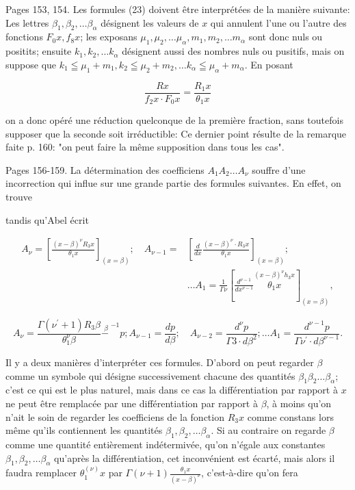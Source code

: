 \documentclass{article}
\begin{document}
Pages 153, 154. Les formules (23) doivent être interprétées de la manière suivante: Les lettres \(\beta_{1}, \beta_{2}, \ldots \beta_{\alpha}\) désignent les valeurs de \(x\) qui annulent l'une ou l'autre des fonctions \(F_{0} x, f_{8} x\); les exposans \(\mu_{1}, \mu_{2}, \ldots \mu_{\alpha}, m_{1}, m_{2}, \ldots m_{\alpha}\) sont donc nuls ou positits; ensuite \(k_{1}, k_{2}, \ldots k_{\alpha}\) désignent aussi des nombres nuls ou pusitifs, mais on suppose que \(k_{1} \leqq \mu_{1}+m_{1}, k_{2} \leqq \mu_{2}+m_{2}, \ldots k_{\alpha} \leqq \mu_{\alpha}+m_{\alpha}\). En posant

\[
\frac{R x}{f_{2} x \cdot F_{0} x}=\frac{R_{1} x}{\theta_{1} x}
\]

on a donc opéré une réduction quelconque de la première fraction, sans toutefois supposer que la seconde soit irréductible: Ce dernier point résulte de la remarque faite p. 160: "on peut faire la même supposition dans tous les cas".

Pages 156-159. La détermination des coefficiens \(A_{1} A_{2} \ldots A_{\nu}\) souffre d'une incorrection qui influe sur une grande partie des formules suivantes. En effet, on trouve

tandis qu'Abel écrit

\[
\begin{aligned}
A_{\nu}=\left[\frac{(x-\beta)^{\nu} R_{3} x}{\theta_{1} x}\right]_{(x=\beta)} ; \quad A_{\nu-1}= & {\left[\frac{d}{d x} \frac{(x-\beta)^{\nu} \cdot R_{3} x}{\theta_{1} x}\right]_{(x=\beta)} ; } \\
& \ldots A_{1}=\frac{1}{\Gamma \nu}\left[\frac{d^{\nu-1}}{d x^{\nu-1}} \stackrel{(x-\beta)^{\nu} h_{3} x}{\theta_{1} x}\right]_{(x=\beta)},
\end{aligned}
\]

\[
A_{\nu}=\frac{\Gamma\left(\nu^{\prime}+1\right) R_{3} \beta}{\theta_{1}^{\nu} \beta} \stackrel{\beta}{-~}^{-1} p ; A_{\nu-1}=\frac{d p}{d \beta} ; \quad A_{\nu-2}=\frac{d^{\nu} p}{\Gamma 3 \cdot d \beta^{2}} ; \ldots A_{1}=\frac{d^{\nu-1} p}{\Gamma \nu^{\prime} \cdot d \beta^{\nu-1}} .
\]

Il y a deux manières d'interpréter ces formules. D'abord on peut regarder \(\beta\) comme un symbole qui désigne successivement chacune des quantités \(\beta_{1} \beta_{2} \ldots \beta_{\alpha}\); c'est ce qui est le plus naturel, mais dans ce cas la différentiation par rapport à \(x\) ne peut être remplacée par une différentiation par rapport à \(\beta\), à moins qu'on n'ait le soin de regarder les coefficiens de la fonction \(R_{3} x\) comme constans lors même qu'ils contiennent les quantités \(\beta_{1}, \beta_{2}, \ldots \beta_{\alpha}\). Si au contraire on regarde \(\beta\) comme une quantité entièrement indétermivée, qu'on n'égale aux constantes \(\beta_{1}, \beta_{2}, \ldots \beta_{\alpha}\) qu'après la différentiation, cet inconvénient est écarté, mais alors il faudra remplacer \(\theta_{1}^{(\nu)} x\) par \(\Gamma(\nu+1) \frac{\theta_{1} x}{(x-\beta)^{\nu}}\), c'est-à-dire qu'on fera
\end{document}
